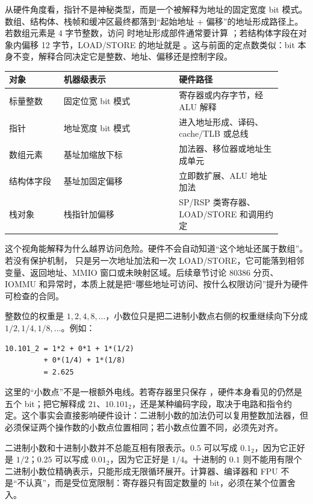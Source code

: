 从硬件角度看，指针不是神秘类型，而是一个被解释为地址的固定宽度 bit 模式。数组、结构体、栈帧和缓冲区最终都落到“起始地址 + 偏移”的地址形成路径上。若数组元素是 4 字节整数，访问  时地址形成部件通常要计算 ；若结构体字段在对象内偏移 12 字节，LOAD/STORE 的地址就是 。这与前面的定点数类似：bit 本身不变，解释合同决定它是整数、地址、偏移还是控制字段。

\begin{longtable}{L{0.18\linewidth}L{0.38\linewidth}L{0.34\linewidth}}
\toprule
对象 & 机器级表示 & 硬件路径 \\
\midrule
标量整数 & 固定位宽 bit 模式 & 寄存器或内存字节，经 ALU 解释 \\
指针 & 地址宽度 bit 模式 & 进入地址形成、译码、cache/TLB 或总线 \\
数组元素 & 基址加缩放下标 & 加法器、移位器或地址生成单元 \\
结构体字段 & 基址加固定偏移 & 立即数扩展、ALU 地址加法 \\
栈对象 & 栈指针加偏移 & SP/RSP 类寄存器、LOAD/STORE 和调用约定 \\
\bottomrule
\end{longtable}

这个视角能解释为什么越界访问危险。硬件不会自动知道“这个地址还属于数组”。若没有保护机制， 只是另一次地址加法和一次 LOAD/STORE，它可能落到相邻变量、返回地址、MMIO 窗口或未映射区域。后续章节讨论 80386 分页、IOMMU 和异常时，本质上就是把“哪些地址可访问、按什么权限访问”提升为硬件可检查的合同。

整数位的权重是 $1,2,4,8,\ldots$，小数位只是把二进制小数点右侧的权重继续向下分成 $1/2,1/4,1/8,\ldots$。例如：

\begin{lstlisting}
10.101_2 = 1*2 + 0*1 + 1*(1/2)
         + 0*(1/4) + 1*(1/8)
         = 2.625
\end{lstlisting}

这里的“小数点”不是一根额外电线。若寄存器里只保存 ，硬件本身看见的仍然是五个 bit；把它解释成 $21$、$10.101_2$，还是某种编码字段，取决于电路和指令约定。这个事实会直接影响硬件设计：二进制小数的加法仍可以复用整数加法器，但必须保证两个操作数的小数点位置相同；若小数点位置不同，必须先对齐。

二进制小数和十进制小数并不总能互相有限表示。$0.5$ 可以写成 $0.1_2$，因为它正好是 $1/2$；$0.25$ 可以写成 $0.01_2$，因为它正好是 $1/4$。十进制的 $0.1$ 则不能用有限个二进制小数位精确表示，只能形成无限循环展开。计算器、编译器和 FPU 不是“不认真”，而是受位宽限制：寄存器只有固定数量的 bit，必须在某个位置舍入。

